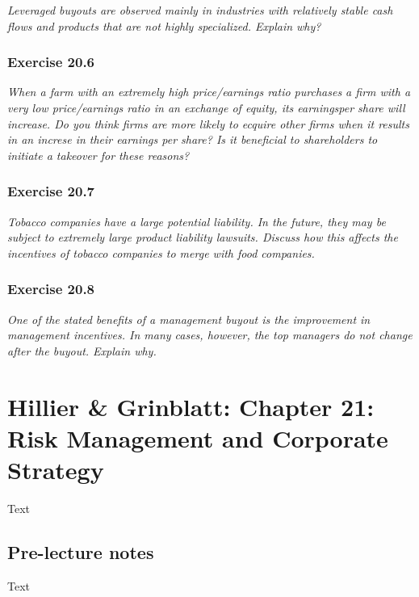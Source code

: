 \documentclass[]{book}
\theoremstyle{definition}
\theoremstyle{definition}
\theoremstyle{remark}
\begin{document}
\emph{Leveraged buyouts are observed mainly in industries with
relatively stable cash flows and products that are not highly
specialized. Explain why?} \citep[p.678]{book}

\subsection{Exercise 20.6}\label{exercise-20.6}

\emph{When a farm with an extremely high price/earnings ratio purchases
a firm with a very low price/earnings ratio in an exchange of equity,
its earningsper share will increase. Do you think firms are more likely
to ecquire other firms when it results in an increse in their earnings
per share? Is it beneficial to shareholders to initiate a takeover for
these reasons?} \citep[p.678]{book}

\subsection{Exercise 20.7}\label{exercise-20.7}

\emph{Tobacco companies have a large potential liability. In the future,
they may be subject to extremely large product liability lawsuits.
Discuss how this affects the incentives of tobacco companies to merge
with food companies.} \citep[p.678]{book}

\subsection{Exercise 20.8}\label{exercise-20.8}

\emph{One of the stated benefits of a management buyout is the
improvement in management incentives. In many cases, however, the top
managers do not change after the buyout. Explain why.}
\citep[p.678]{book}

\chapter{Hillier \& Grinblatt: Chapter 21: Risk Management and Corporate
Strategy}\label{hillier-grinblatt-chapter-21-risk-management-and-corporate-strategy}

Text

\section{Pre-lecture notes}\label{pre-lecture-notes-21}

Text
\end{document}
